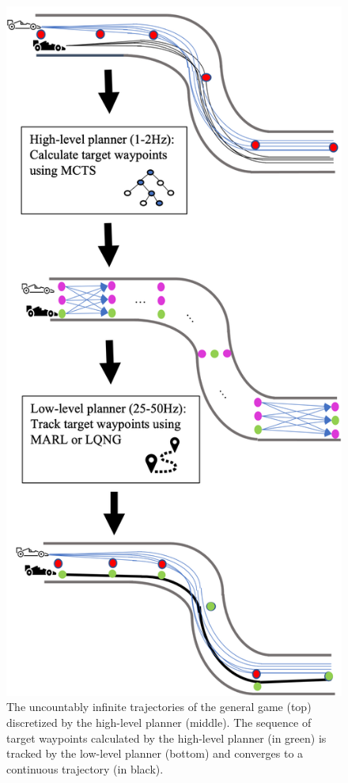 \begin{figure}
  \centering
    \includegraphics[height=0.8\textheight]{Figures/FormulationBreakdownVert.png}
  \caption[Hierarchical Control Architecture]{The uncountably infinite trajectories of the general game (top) discretized by the high-level planner (middle). The sequence of target waypoints calculated by the high-level planner (in green) is tracked by the low-level planner (bottom) and converges to a continuous trajectory (in black).}
  \label{fig:overall_control}
\end{figure}
